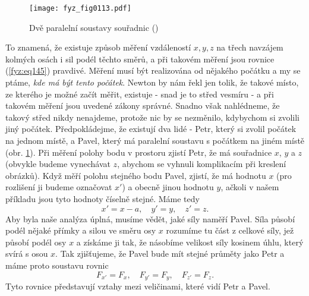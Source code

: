     \begin{figure}[ht!]  %
      \centering
      \texttt{[image: fyz\_fig0113.pdf]}
      \caption{Dvě paralelní soustavy souřadnic (\cite[s.~154]{Feynman01})}
      \label{fyz:fig0113}
    \end{figure}
    To znamená, že existuje způsob měření vzdáleností \(x, y, z\) na třech navzájem kolmých osách i
    sil podél těchto směrů, a při takovém měření jsou rovnice (\ref{fyz:eq145}) pravdivé. Měření
    musí být realizována od nějakého počátku a my se ptáme, \emph{kde má být tento počátek}. Newton
    by nám řekl jen tolik, že takové místo, ze kterého je možné začít měřit, existuje - snad je to
    střed vesmíru - a při takovém měření jsou uvedené zákony správné. Snadno však nahlédneme, že
    takový střed nikdy nenajdeme, protože nic by se nezměnilo, kdybychom si zvolili jiný počátek.
    Předpokládejme, že existují dva lidé - Petr, který si zvolil počátek na jednom místě, a Pavel,
    který má paralelní soustavu s počátkem na jiném místě (obr. \ref{fyz:fig0113}). Při měření polohy
    bodu v prostoru zjistí Petr, že má souřadnice \(x\), \(y\) a \(z\) (obvykle budeme vynechávat
    \(z\), abychom se vyhnuli komplikacím při kreslení obrázků). Když měří polohu stejného bodu
    Pavel, zjistí, že má hodnotu \(x\) (pro rozlišení ji budeme označovat \(x'\)) a obecně jinou
    hodnotu \(y\), ačkoli v našem příkladu jsou tyto hodnoty číselně stejné. Máme tedy
    \begin{equation}\label{fyz:eq146}
      x' = x - a, \quad y' = y, \quad z' = z.
    \end{equation}
    Aby byla naše analýza úplná, musíme vědět, jaké síly naměří Pavel. Síla působí podél nějaké 
    přímky a silou ve směru osy \(x\) rozumíme tu část z celkové síly, jež působí podél osy \(x\) a 
    získáme ji tak, že násobíme velikost síly kosinem úhlu, který svírá s osou \(x\). Tak 
    zjišťujeme, že Pavel bude mít stejné průměty jako Petr a máme proto soustavu rovnic
    \begin{equation}\label{fyz:eq147}
      F_{x'} = F_x, \quad F_{y'} = F_y, \quad F_{z'} = F_z.
    \end{equation}
    Tyto rovnice představují vztahy mezi veličinami, které vidí Petr a Pavel.
    
